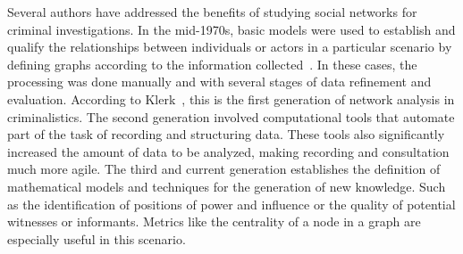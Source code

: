 Several authors have addressed the benefits of studying social networks for criminal investigations. In the mid-1970s, basic models were used to establish and qualify the relationships between individuals or actors in a particular scenario by defining graphs according to the information collected~\cite{harper1975application}. In these cases, the processing was done manually and with several stages of data refinement and evaluation. According to Klerk~\cite{Klerks1999TheNP}, this is the first generation of network analysis in criminalistics. The second generation involved computational tools that automate part of the task of recording and structuring data. These tools also significantly increased the amount of data to be analyzed, making recording and consultation much more agile. The third and current generation establishes the definition of mathematical models and techniques for the generation of new knowledge. Such as the identification of positions of power and influence or the quality of potential witnesses or informants. Metrics like the centrality of a node in a graph are especially useful in this scenario.


